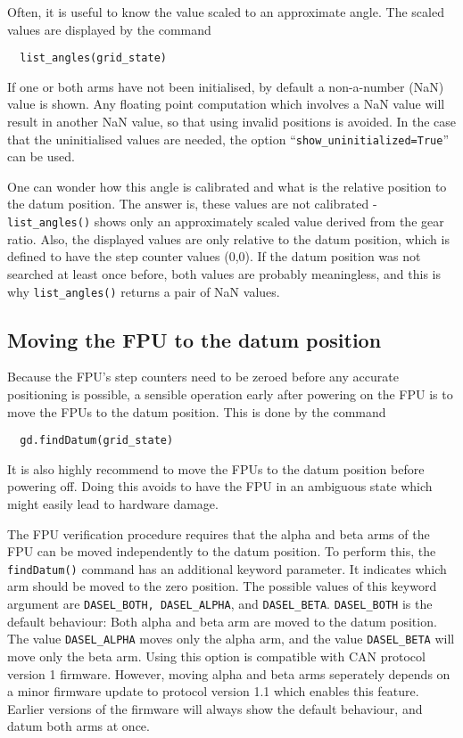 \documentclass{scrartcl}[12pt,a4paper]
\begin{document}
Often, it is useful to know the value scaled
to an approximate angle. The scaled values
are displayed by the command

\begin{verbatim}
  list_angles(grid_state)
\end{verbatim}

If one or both arms have not been initialised, by default a
non-a-number (NaN) value is shown. Any floating point computation
which involves a NaN value will result in another NaN value, so that
using invalid positions is avoided.  In the case that the
uninitialised values are needed, the option
``\texttt{show\_uninitialized=True}'' can be used.


One can wonder how this angle is calibrated and what is the relative
position to the datum position. The answer is, these values are not
calibrated - \texttt{list\_angles()} shows only an approximately
scaled value derived from the gear ratio.  Also, the displayed values
are only relative to the datum position, which is defined to have the
step counter values (0,0). If the datum position was not searched at
least once before, both values are probably meaningless, and this is
why \texttt{list\_angles()} returns a pair of NaN values.




\subsection{Moving the FPU to the datum position}

Because the FPU's step counters need to be zeroed
before any accurate positioning is possible, a
sensible operation early after powering on
the FPU is to move the FPUs to the datum position.
This is done by the command

\begin{verbatim}
  gd.findDatum(grid_state)
\end{verbatim}

It is also highly recommend to move the FPUs to the datum position
before powering off. Doing this avoids to have the FPU in an ambiguous
state which might easily lead to hardware damage.

The FPU verification procedure requires that the alpha and beta arms
of the FPU can be moved independently to the datum position.  To
perform this, the \texttt{findDatum()} command has an additional
keyword parameter. It indicates which arm should be moved to the zero
position. The possible values of this keyword argument are
\texttt{DASEL\_BOTH, DASEL\_ALPHA}, and \texttt{DASEL\_BETA}.
\texttt{DASEL\_BOTH} is the default behaviour: Both alpha and beta arm
are moved to the datum position. The value \texttt{DASEL\_ALPHA} moves
only the alpha arm, and the value \texttt{DASEL\_BETA} will move only
the beta arm. Using this option is compatible with CAN protocol
version 1 firmware. However, moving alpha and beta arms seperately
depends on a minor firmware update to protocol version 1.1 which
enables this feature. Earlier versions of the firmware will always
show the default behaviour, and datum both arms at once.
\end{document}
